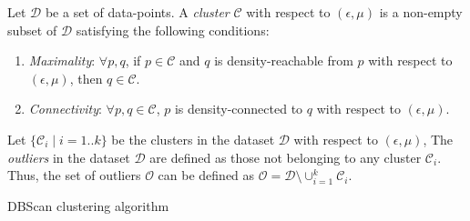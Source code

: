 \begin{definition} [cluster]
	Let $\mathcal{D}$ be a set of data-points. A {\em cluster} $\mathcal{C}$ with respect to $(\epsilon,\mu)$ is a non-empty subset 
	of $\mathcal{D}$ satisfying the following conditions:
	\begin{enumerate}
		\item {\em Maximality}: $\forall p, q$, if $p \in \mathcal{C}$ and $q$ is density-reachable from $p$ with respect to
			$(\epsilon,\mu)$, then $q \in \mathcal{C}$. 
		\item {\em Connectivity}: $\forall p, q  \in \mathcal{C}$, $p$ is density-connected to $q$ with respect to $(\epsilon,\mu)$.
	\end{enumerate}
\end{definition}

\begin{definition} [outlier]
	Let $\{ \mathcal{C}_i \mid i = 1 .. k \}$ be the clusters in the dataset $\mathcal{D}$ with respect to $(\epsilon,\mu)$, 
	The {\em outliers} in the dataset $\mathcal{D}$ are defined as those not belonging to any cluster $\mathcal{C}_i$. 
	Thus, the set of outliers $\mathcal{O}$ can be defined as $\mathcal{O} = \mathcal{D} \setminus \cup_{i=1}^k \mathcal{C}_i$.
\end{definition}

\begin{algorithm}[!htbp]
	\DontPrintSemicolon
	\SetAlgoLined
\caption{DBScan clustering algorithm}
\label{algo:bigdata:dbscan}
\end{algorithm}

